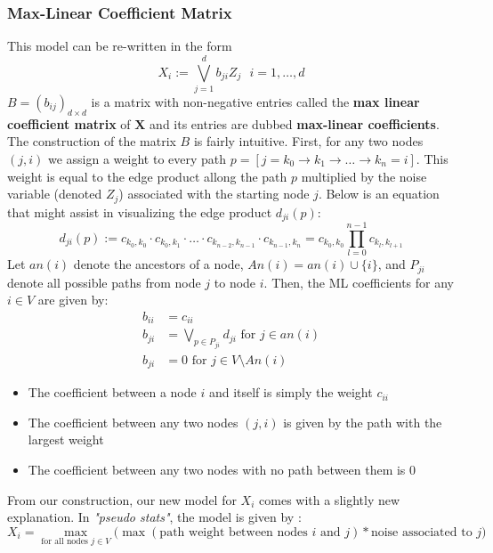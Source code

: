 \documentclass[12pt]{article}
\def\x{\mathbf{X}}
\theoremstyle{definition}
\theoremstyle{definition}
\begin{document}
\subsubsection{Max-Linear Coefficient Matrix}
\noindent This model can be re-written in the form $$X_i:= \bigvee_{j=1}^db_{ji}Z_j\ \ \  i=1,\hdots,d$$
$B=(b_{ij})_{d\times d}$ is a matrix with non-negative entries called the \textbf{max linear coefficient matrix} of $\x$ and its entries are dubbed \textbf{max-linear coefficients}. The construction of the matrix $B$ is fairly intuitive. First, for any two nodes $(j,i)$ we assign a weight to every path $p= [j=k_0\rightarrow k_1\rightarrow \hdots \rightarrow k_n=i]$. This weight is equal to the edge product allong the path $p$ multiplied by the noise variable (denoted $Z_j$) associated with the starting node $j$. Below is an equation that might assist in visualizing the edge product $d_{ji}(p)$:
$$d_{ji}(p):=c_{k_0,k_0}\cdot c_{k_0,k_1}\cdot\hdots\cdot c_{k_{n-2},k_{n-1}}\cdot c_{k_{n-1},k_n}=c_{k_0,k_0}\prod_{l=0}^{n-1}c_{k_l,k_{l+1}}$$
Let $an(i)$ denote the ancestors of a node, $An(i)=an(i)\cup\{i\}$, and $P_{ji}$ denote all possible paths from node $j$ to node $i$. Then, the ML coefficients for any $i\in V$ are given by:
\begin{align*}
    b_{ii}&= c_{ii}\\
    b_{ji}&=\bigvee_{p\in P_{ji}}d_{ji} \text{ for }j\in an(i)\\
    b_{ji}&=0 \text{ for } j \in V \setminus An(i)
\end{align*}
\begin{itemize}
 \item The coefficient between a node $i$ and itself is simply the weight $c_{ii}$
    \item The coefficient between any two nodes $(j,i)$ is given by the path with the largest weight
    \item The coefficient between any two nodes with no path between them is $0$
\end{itemize}
From our construction, our new model for $X_i$ comes with a slightly new explanation. In \textit{"pseudo stats"}, the model is given by :
$$X_i=\max_{\text{for all nodes }j\in V}\bigg( \max(\text{path weight between nodes }i \text{ and }j ) * \text{noise associated to }j\bigg) $$
\pagebreak
\end{document}
